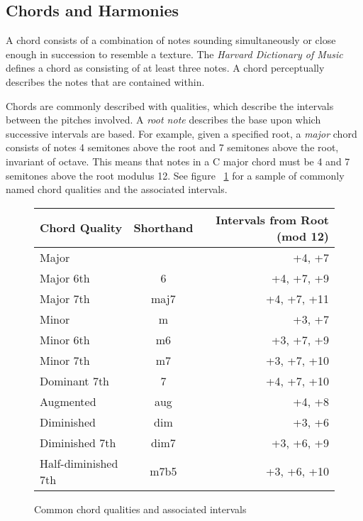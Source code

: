 \subsection{Chords and Harmonies}

A chord consists of a combination of notes sounding simultaneously or close enough in succession to resemble a texture. The \textit{Harvard Dictionary of Music} defines a chord as consisting of at least three notes\cite{harvdict}. A chord perceptually describes the notes that are contained within.

Chords are commonly described with qualities, which describe the intervals between the pitches involved. A \textit{root note} describes the base upon which successive intervals are based. For example, given a specified root, a \textit{major} chord consists of notes 4 semitones above the root and 7 semitones above the root, invariant of octave. This means that notes in a C major chord must be 4 and 7 semitones above the root modulus 12. See figure ~\ref{fig:qualitytable} for a sample of commonly named chord qualities and the associated intervals.

\begin{figure}[h!]
\begin{center}
\begin{tabular}{lcr}
\toprule
Chord Quality       & Shorthand & Intervals from Root (mod 12) \\
\midrule
Major               &           & +4, +7     \\
Major 6th           & 6         & +4, +7, +9 \\
Major 7th           & maj7      & +4, +7, +11\\
Minor               & m         & +3, +7     \\
Minor 6th           & m6        & +3, +7, +9 \\
Minor 7th           & m7        & +3, +7, +10\\
Dominant 7th        & 7         & +4, +7, +10\\
Augmented           & aug       & +4, +8     \\
Diminished          & dim       & +3, +6     \\
Diminished 7th      & dim7      & +3, +6, +9 \\
Half-diminished 7th & m7b5      & +3, +6, +10\\
\bottomrule
\end{tabular}
\caption{Common chord qualities and associated intervals}
\label{fig:qualitytable}
\end{center}
\end{figure}

